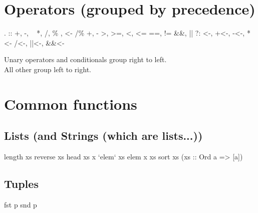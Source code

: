 \documentclass{refcard}
\begin{document}
\section{Operators (grouped by precedence)}

\begin{Ldesc}
	 .
	 ::
	 +, -, ~
	 *, /, \%
	 , <-  /\% 
	 +, -
	\Li[comparisons                  ] >, >=, <, <=
	\Li[comparisons                  ] ==, !=
	\Li[and, or                      ] \&\&, ||
	 ?:
	\Li[assignments                  ] <-, +<-, -<-, *<-
	\li                                /<-, ||<-, \&\&<-
\end{Ldesc}

\noindent
Unary operators and conditionals group right to left.\\
All other group left to right.


\section{Common functions}

\subsection{Lists {\small (and Strings {\tiny(which are lists...)})}}

\begin{ldesc}
	         length xs
	      reverse xs
	  head xs
	      x `elem` xs
	                                     elem x xs
	\li[sorts \C{xs}]                    sort xs
	\li                                  (xs :: Ord a => [a])
\end{ldesc}

\subsection{Tuples}

\begin{ldesc}
	             fst p
	            snd p
\end{ldesc}
\end{document}
